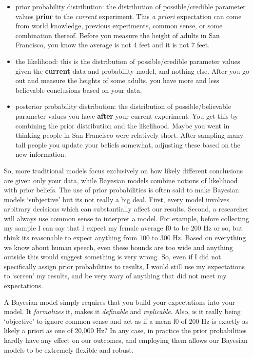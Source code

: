 \documentclass[
]{book}
\begin{document}
\begin{itemize}
\item
  prior probability distribution: the distribution of possible/credible parameter values \textbf{prior} to the \emph{current} experiment. This \emph{a priori} expectation can come from world knowledge, previous experiments, common sense, or some combination thereof. Before you measure the height of adults in San Francisco, you know the average is not 4 feet and it is not 7 feet.
\item
  the likelihood: this is the distribution of possible/credible parameter values given the \textbf{current} data and probability model, and nothing else. After you go out and measure the heights of some adults, you have more and less believable conclusions based on your data.
\item
  posterior probability distribution: the distribution of possible/believable parameter values you have \textbf{after} your current experiment. You get this by combining the prior distribution and the likelihood. Maybe you went in thinking people in San Francisco were relatively short. After sampling many tall people you update your beliefs somewhat, adjusting these based on the new information.
\end{itemize}

So, more traditional models focus exclusively on how likely different conclusions are given only your data, while Bayesian models combine notions of likelihood with prior beliefs. The use of prior probabilities is often said to make Bayesian models `subjective' but its not really a big deal. First, every model involves arbitrary decisions which can substantially affect our results. Second, a researcher will always use common sense to interpret a model. For example, before collecting my sample I can say that I expect my female average f0 to be 200 Hz or so, but think its reasonable to expect anything from 100 to 300 Hz. Based on everything we know about human speech, even these bounds are too wide and anything outside this would suggest something is very wrong. So, even if I did not specifically assign prior probabilities to results, I would still use my expectations to `screen' my results, and be very wary of anything that did not meet my expectations.

A Bayesian model simply requires that you build your expectations into your model. It \emph{formalizes} it, makes it \emph{definable} and \emph{replicable}. Also, is it really being `objective' to ignore common sense and act as if a mean f0 of 200 Hz is exactly as likely a priori as one of 20,000 Hz? In any case, in practice the prior probabilities hardly have any effect on our outcomes, and employing them allows our Bayesian models to be extremely flexible and robust.
\end{document}
